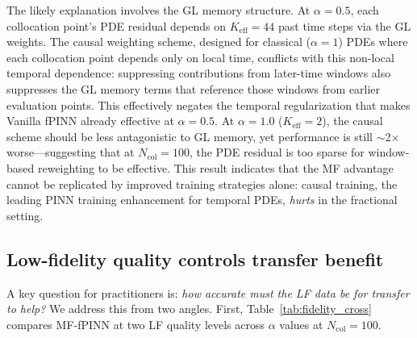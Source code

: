 \documentclass[11pt]{article}
\newcommand{\Ncol}{N_{\mathrm{col}}}
\begin{document}
The likely explanation involves the GL memory structure. At $\alpha = 0.5$, each collocation point's PDE residual depends on $K_{\mathrm{eff}} = 44$ past time steps via the GL weights. The causal weighting scheme, designed for classical ($\alpha = 1$) PDEs where each collocation point depends only on local time, conflicts with this non-local temporal dependence: suppressing contributions from later-time windows also suppresses the GL memory terms that reference those windows from earlier evaluation points. This effectively negates the temporal regularization that makes Vanilla fPINN already effective at $\alpha = 0.5$. At $\alpha = 1.0$ ($K_{\mathrm{eff}} = 2$), the causal scheme should be less antagonistic to GL memory, yet performance is still $\sim$2$\times$ worse---suggesting that at $\Ncol = 100$, the PDE residual is too sparse for window-based reweighting to be effective. This result indicates that the MF advantage cannot be replicated by improved training strategies alone: causal training, the leading PINN training enhancement for temporal PDEs, \emph{hurts} in the fractional setting.

\subsection{Low-fidelity quality controls transfer benefit}
\label{sec:fidelity}

A key question for practitioners is: \emph{how accurate must the LF data be for transfer to help?} We address this from two angles. First, Table~\ref{tab:fidelity_cross} compares MF-fPINN at two LF quality levels across $\alpha$ values at $\Ncol = 100$.

\begin{table}[t]
\centering
\caption{Impact of LF data quality on MF-fPINN across $\alpha$ at $\Ncol = 100$ (10 seeds). With $N_{\mathrm{terms}} = 8$ ($\sim$41\% error at $\alpha = 0.5$, $\sim$25\% at $\alpha = 1.0$), MF \emph{hurts} at both $\alpha$ values ($0.16\times$ and $0.60\times$). With $N_{\mathrm{terms}} = 12$ ($\sim$17\% / $\sim$10\% error), MF is neutral at $\alpha = 0.5$ ($0.86\times$) and significantly beneficial at $\alpha = 1.0$ ($1.80\times$, $p = 0.020$).}
\label{tab:fidelity_cross}
\end{table}
\end{document}

